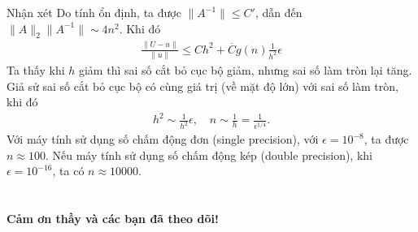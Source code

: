 \documentclass[9pt]{beamer}
\numberwithin{equation}{section}
\begin{document}
\begin{frame}
\begin{exampleblock}{Nhận xét}
Do tính ổn định, ta được $\|A^{-1}\| \le C'$, dẫn đến $\|A\|_2\|A^{-1}\| \sim 4n^2$. Khi đó
\begin{align*}
    \frac{\|U-u\|}{\|u\|}
    \le Ch^2 + \overline{C} g(n) \frac{1}{h^2} \epsilon
\end{align*}
Ta thấy khi $h$ giảm thì sai số cắt bỏ cục bộ giảm, nhưng sai số làm tròn lại tăng. \\

Giả sử sai số cắt bỏ cục bộ có cùng giá trị (về mặt độ lớn) với sai số làm tròn, khi đó
\begin{align*}
    h^2 \sim \frac{1}{h^2} \epsilon, \quad n \sim \frac{1}{h} = \frac{1}{\epsilon^{1/4}}.
\end{align*}
Với máy tính sử dụng số chấm động đơn (single precision), với $\epsilon = 10^{-8}$, ta được $n \approx 100$. Nếu máy tính sử dụng số chấm động kép (double precision), khi $\epsilon = 10^{-16}$, ta có $n \approx 10000$.
\end{exampleblock}
\end{frame}

\section{}

\begin{frame}
    \begin{center}
        \Huge {\bf Cảm ơn thầy và các bạn đã theo dõi!}
    \end{center}
\end{frame}
\end{document}
